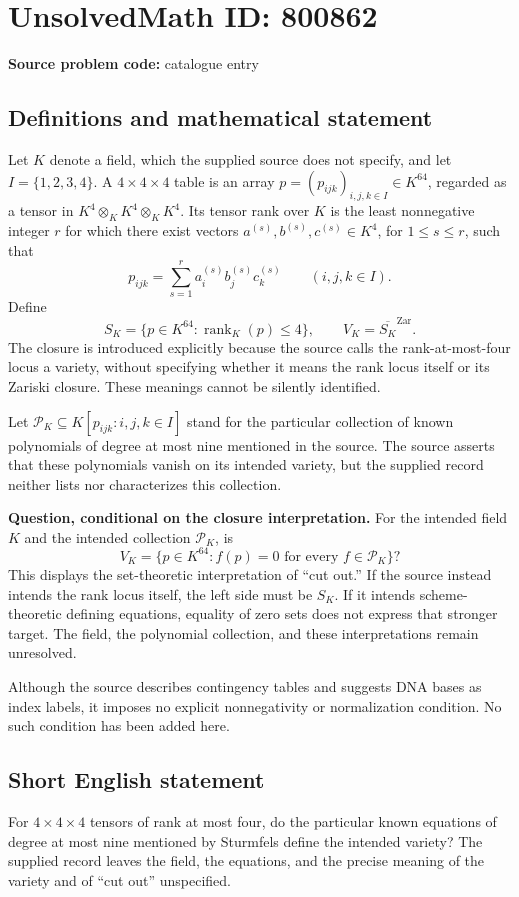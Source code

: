 \documentclass[11pt]{article}
\begin{document}
\section*{UnsolvedMath ID: 800862}
\textbf{Source problem code:} catalogue entry
\subsection{Definitions and mathematical statement}
Let \(K\) denote a field, which the supplied source does not specify, and let \(I=\{1,2,3,4\}\). A \(4\times4\times4\) table is an array \(p=(p_{ijk})_{i,j,k\in I}\in K^{64}\), regarded as a tensor in \(K^4\otimes_K K^4\otimes_K K^4\). Its tensor rank over \(K\) is the least nonnegative integer \(r\) for which there exist vectors \(a^{(s)},b^{(s)},c^{(s)}\in K^4\), for \(1\le s\le r\), such that
\[
p_{ijk}=\sum_{s=1}^{r}a_i^{(s)}b_j^{(s)}c_k^{(s)}
\qquad(i,j,k\in I).
\]
Define
\[
S_K=\{p\in K^{64}:\operatorname{rank}_K(p)\le4\},
\qquad V_K=\overline{S_K}^{\mathrm{Zar}}.
\]
The closure is introduced explicitly because the source calls the rank-at-most-four locus a variety, without specifying whether it means the rank locus itself or its Zariski closure. These meanings cannot be silently identified.

Let \(\mathcal P_K\subseteq K[p_{ijk}:i,j,k\in I]\) stand for the particular collection of known polynomials of degree at most nine mentioned in the source. The source asserts that these polynomials vanish on its intended variety, but the supplied record neither lists nor characterizes this collection.

\textbf{Question, conditional on the closure interpretation.} For the intended field \(K\) and the intended collection \(\mathcal P_K\), is
\[
V_K=\{p\in K^{64}:f(p)=0\text{ for every }f\in\mathcal P_K\}?
\]
This displays the set-theoretic interpretation of ``cut out.'' If the source instead intends the rank locus itself, the left side must be \(S_K\). If it intends scheme-theoretic defining equations, equality of zero sets does not express that stronger target. The field, the polynomial collection, and these interpretations remain unresolved.

Although the source describes contingency tables and suggests DNA bases as index labels, it imposes no explicit nonnegativity or normalization condition. No such condition has been added here.
\subsection{Short English statement}
For \(4\times4\times4\) tensors of rank at most four, do the particular known equations of degree at most nine mentioned by Sturmfels define the intended variety? The supplied record leaves the field, the equations, and the precise meaning of the variety and of ``cut out'' unspecified.
\end{document}
